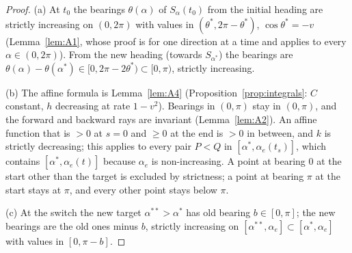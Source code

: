 \begin{proof}
(a) At $t_0$ the bearings $\theta(\alpha)$ of $S_\alpha(t_0)$ from the initial heading are strictly increasing on $(0,2\pi)$ with
values in $(\theta^*,2\pi-\theta^*)$, $\cos\theta^*=-v$ (Lemma~\ref{lem:A1}, whose proof is for one direction at a time and applies to
every $\alpha\in(0,2\pi)$). From the new heading (towards $S_{\alpha^*}$) the bearings are
$\theta(\alpha)-\theta(\alpha^*)\in[0,2\pi-2\theta^*)\subset[0,\pi)$, strictly increasing.

(b) The affine formula is Lemma~\ref{lem:A4} (Proposition~\ref{prop:integrals}: $C$ constant, $h$ decreasing at rate $1-v^2$).
Bearings in $(0,\pi)$ stay in $(0,\pi)$, and the forward and backward rays are invariant (Lemma~\ref{lem:A2}). An affine function
that is $>0$ at $s=0$ and $\ge0$ at the end is $>0$ in between, and $k$ is strictly decreasing; this applies to every pair
$P<Q$ in $[\alpha^*,\alpha_e(t_s)]$, which contains $[\alpha^*,\alpha_e(t)]$ because $\alpha_e$ is non-increasing. A point at
bearing $0$ at the start other than the target is excluded by strictness; a point at bearing $\pi$ at the start stays at $\pi$,
and every other point stays below $\pi$.

(c) At the switch the new target $\alpha^{**}>\alpha^*$ has old bearing $b\in[0,\pi]$; the new bearings are the old ones minus $b$,
strictly increasing on $[\alpha^{**},\alpha_e]\subset[\alpha^*,\alpha_e]$ with values in $[0,\pi-b]$.


\end{proof}
